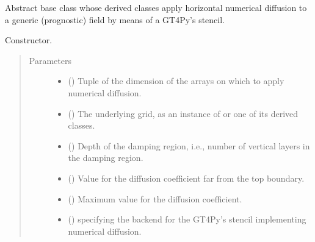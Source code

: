 \documentclass[letterpaper,10pt,english]{sphinxmanual}
\begin{document}
\begin{fulllineitems}
\label{\detokenize{api:dycore.diffusion.Diffusion}}
Abstract base class whose derived classes apply horizontal numerical diffusion to a generic (prognostic)
field by means of a GT4Py’s stencil.

\begin{fulllineitems}
\label{\detokenize{api:dycore.diffusion.Diffusion.__init__}}
Constructor.
\begin{quote}\begin{description}
\item[{Parameters}] \leavevmode\begin{itemize}
\item {} 
 () \textendash{} Tuple of the dimension of the arrays on which to apply numerical diffusion.

\item {} 
 () \textendash{} The underlying grid, as an instance of {\hyperref[\detokenize{api:grids.grid_xyz.GridXYZ}]{}} or one of its derived classes.

\item {} 
 () \textendash{} Depth of the damping region, i.e., number of vertical layers in the damping region.

\item {} 
 () \textendash{} Value for the diffusion coefficient far from the top boundary.

\item {} 
 () \textendash{} Maximum value for the diffusion coefficient.

\item {} 
 () \textendash{}  specifying the backend for the GT4Py’s stencil implementing numerical diffusion.


\end{itemize}
\end{description}
\end{quote}
\end{fulllineitems}
\end{fulllineitems}
\end{document}
